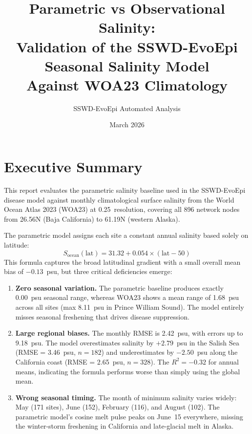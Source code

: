 \documentclass[11pt,a4paper]{article}
\title{Parametric vs Observational Salinity:\\
Validation of the SSWD-EvoEpi Seasonal Salinity Model\\
Against WOA23 Climatology}
\author{SSWD-EvoEpi Automated Analysis}
\date{March 2026}
\begin{document}
\maketitle

\section{Executive Summary}

This report evaluates the parametric salinity baseline used in the SSWD-EvoEpi
disease model against monthly climatological surface salinity from the World
Ocean Atlas 2023 (WOA23) at 0.25\textdegree\ resolution, covering all 896
network nodes from 26.56\textdegree N (Baja California) to 61.19\textdegree N
(western Alaska).

The parametric model assigns each site a constant annual salinity based solely
on latitude:
\begin{equation}
S_{\text{ocean}}(\text{lat}) = 31.32 + 0.054 \times (\text{lat} - 50)
\label{eq:parametric}
\end{equation}
This formula captures the broad latitudinal gradient with a small overall mean
bias of $-0.13$~psu, but three critical deficiencies emerge:

\begin{enumerate}
    \item \textbf{Zero seasonal variation.} The parametric baseline produces
    exactly 0.00~psu seasonal range, whereas WOA23 shows a mean range of
    1.68~psu across all sites (max 8.11~psu in Prince William Sound). The model
    entirely misses seasonal freshening that drives disease suppression.

    \item \textbf{Large regional biases.} The monthly RMSE is 2.42~psu, with
    errors up to 9.18~psu. The model overestimates salinity by $+2.79$~psu in
    the Salish Sea (RMSE = 3.46~psu, $n=182$) and underestimates by $-2.50$~psu
    along the California coast (RMSE = 2.65~psu, $n=328$). The $R^2 = -0.32$
    for annual means, indicating the formula performs worse than simply using
    the global mean.

    \item \textbf{Wrong seasonal timing.} The month of minimum salinity varies
    widely: May (171 sites), June (152), February (116), and August (102).
    The parametric model's cosine melt pulse peaks on June~15 everywhere,
    missing the winter-storm freshening in California and late-glacial melt in
    Alaska.
\end{enumerate}
\end{document}
